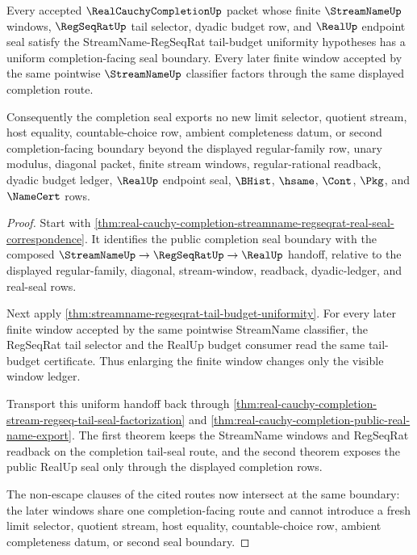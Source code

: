 \begin{theorem}
\label{thm:real-cauchy-completion-tail-budget-uniform-seal-boundary}
Every accepted $\RealCauchyCompletionUp$ packet whose finite $\StreamNameUp$ windows, $\RegSeqRatUp$ tail selector, dyadic budget row, and $\RealUp$ endpoint seal satisfy the StreamName-RegSeqRat tail-budget uniformity hypotheses has a uniform completion-facing seal boundary. Every later finite window accepted by the same pointwise $\StreamNameUp$ classifier factors through the same displayed completion route.

Consequently the completion seal exports no new limit selector, quotient stream, host equality, countable-choice row, ambient completeness datum, or second completion-facing boundary beyond the displayed regular-family row, unary modulus, diagonal packet, finite stream windows, regular-rational readback, dyadic budget ledger, $\RealUp$ endpoint seal, $\BHist$, $\hsame$, $\Cont$, $\Pkg$, and $\NameCert$ rows.
\end{theorem}
\begin{proof}
Start with \autoref{thm:real-cauchy-completion-streamname-regseqrat-real-seal-correspondence}. It identifies the public completion seal boundary with the composed $\StreamNameUp \to \RegSeqRatUp \to \RealUp$ handoff, relative to the displayed regular-family, diagonal, stream-window, readback, dyadic-ledger, and real-seal rows.

Next apply \autoref{thm:streamname-regseqrat-tail-budget-uniformity}. For every later finite window accepted by the same pointwise StreamName classifier, the RegSeqRat tail selector and the RealUp budget consumer read the same tail-budget certificate. Thus enlarging the finite window changes only the visible window ledger.

Transport this uniform handoff back through \autoref{thm:real-cauchy-completion-stream-regseq-tail-seal-factorization} and \autoref{thm:real-cauchy-completion-public-real-name-export}. The first theorem keeps the StreamName windows and RegSeqRat readback on the completion tail-seal route, and the second theorem exposes the public RealUp seal only through the displayed completion rows.

The non-escape clauses of the cited routes now intersect at the same boundary: the later windows share one completion-facing route and cannot introduce a fresh limit selector, quotient stream, host equality, countable-choice row, ambient completeness datum, or second seal boundary.
\end{proof}

